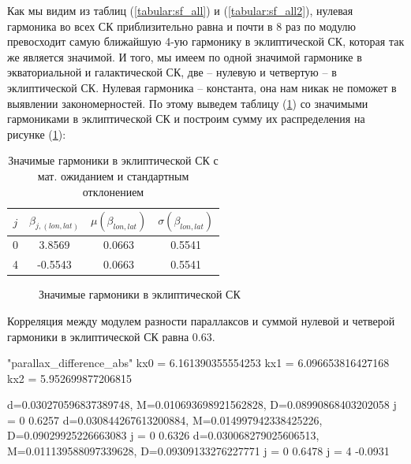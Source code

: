 \documentclass[14pt]{article} %
\begin{document}
Как мы видим из таблиц (\ref{tabular:sf_all}) и (\ref{tabular:sf_all2}), нулевая гармоника во всех СК приблизительно равна и почти в 8 раз по модулю превосходит самую ближайшую 4-ую гармонику в эклиптической СК, которая так же является значимой. И того, мы имеем по одной значимой гармонике в экваториальной и галактической СК, две -- нулевую и четвертую -- в эклиптической СК. Нулевая гармоника -- константа, она нам никак не поможет  в выявлении закономерностей. По этому выведем таблицу (\ref{tabular:sf_04}) со значимыми гармониками в эклиптической СК и построим сумму их распределения на рисунке (\ref{img:sfff}):

\begin{table}[h]
\centering
\caption{Значимые гармоники в эклиптической СК с мат. ожиданием и стандартным отклонением}
\label{tabular:sf_04}
\begin{tabular}{|c|c|c|c|}
\hline 	
$j$ &$\beta_{j,(lon,lat)}$ & $\mu(\beta_{lon,lat})$ & $\sigma(\beta_{lon,lat})$\\
\hline 	
0 &3.8569 &0.0663 &0.5541\\
4 &-0.5543 &0.0663 &0.5541\\
\hline 	
\end{tabular}
\end{table}

\begin{figure}[h!]
\caption{Значимые гармоники в эклиптической СК}
\label{img:sfff}
\end{figure}

Корреляция между модулем разности параллаксов и суммой нулевой и четверой гармоники в эклиптической СК равна 0.63. 

"parallax_difference_abs"
kx0 = 6.161390355554253
kx1 = 6.096653816427168
kx2 = 5.952699877206815



d=0.030270596837389748,	M=0.010693698921562828,	D=0.08990868403202058
j =	0	0.6257
d=0.030844267613200884,	M=0.014997942338425226,	D=0.09029925226663083
j =	0	0.6326
d=0.030068279025606513,	M=0.011139588097339628,	D=0.09309133276227771
j =	0	0.6478
j =	4	-0.0931
\end{document}
